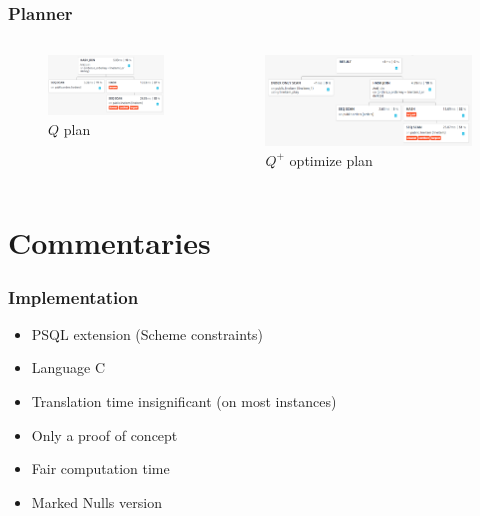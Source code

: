 \documentclass{beamer}
\begin{document}
	\begin{frame}
		\frametitle{Planner}
		\begin{columns}
			\begin{column}{0.35\textwidth}
				\begin{figure}
					\includegraphics[scale=0.22]{qplan}
					\caption{$Q$ plan}
				\end{figure}
			\end{column}
			\begin{column}{0.60\textwidth}
				\begin{figure}
					\includegraphics[scale=0.25]{orqplan}
					\caption{$Q^+$ optimize plan}
				\end{figure}
			\end{column}
		\end{columns}
	\end{frame}
		
		\section{Commentaries}
		
		\begin{frame}
			\frametitle{Implementation}
			\begin{itemize}
				\item PSQL extension (Scheme constraints)
				\item Language C
				\item Translation time insignificant (on most instances)
				\item Only a proof of concept 
				\item Fair computation time
				\item<2> Marked Nulls version
			\end{itemize}
		\end{frame}
		
\end{document}
